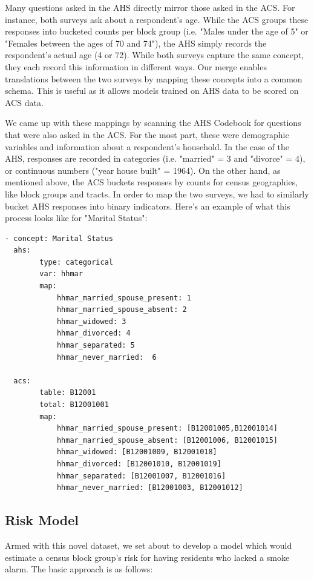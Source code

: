 \documentclass{sig-alternate}
\begin{document}
Many questions asked in the AHS directly mirror those asked in the ACS. For instance, both surveys ask about a respondent's age. While the ACS groups these responses into bucketed counts per block group (i.e. "Males under the age of 5" or "Females between the ages of 70 and 74"), the AHS simply records the respondent's actual age (4 or 72). While both surveys capture the same concept, they each record this information in different ways. Our merge enables translations between the two surveys by mapping these concepts into a common schema. This is useful as it allows models trained on AHS data to be scored on ACS data. 

We came up with these mappings by scanning the AHS Codebook for questions that were also asked in the ACS. For the most part, these were demographic variables and information about a respondent's household. In the case of the AHS, responses are recorded in categories (i.e. "married" = 3 and "divorce" = 4), or continuous numbers ("year house built" = 1964). On the other hand, as mentioned above, the ACS buckets responses by counts for census geographies, like block groups and tracts. In order to map the two surveys, we had to similarly bucket AHS responses into binary indicators. Here's an example of what this process looks like for "Marital Status":
\begin{verbatim}
- concept: Marital Status 
  ahs:
        type: categorical
        var: hhmar 
        map:
            hhmar_married_spouse_present: 1
            hhmar_married_spouse_absent: 2
            hhmar_widowed: 3
            hhmar_divorced: 4
            hhmar_separated: 5
            hhmar_never_married:  6

  acs:
        table: B12001
        total: B12001001
        map:
            hhmar_married_spouse_present: [B12001005,B12001014]
            hhmar_married_spouse_absent: [B12001006, B12001015]
            hhmar_widowed: [B12001009, B12001018]
            hhmar_divorced: [B12001010, B12001019]
            hhmar_separated: [B12001007, B12001016]
            hhmar_never_married: [B12001003, B12001012]
\end{verbatim}

\subsection{Risk Model}

Armed with this novel dataset, we set about to develop a model which would estimate a census block group's risk for having residents who lacked a smoke alarm.  The basic approach is as follows:
\end{document}
